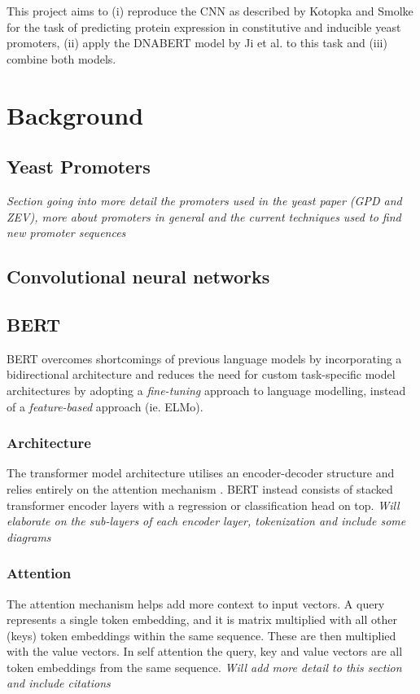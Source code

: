 \documentclass{article}
\begin{document}
This project aims to (i) reproduce the CNN as described by Kotopka and Smolke for the task of predicting protein expression in constitutive and inducible yeast promoters, (ii) apply the DNABERT model by Ji et al. to this task and (iii) combine both models.
 

\section{Background}
\subsection{Yeast Promoters}
\textit{Section going into more detail the promoters used in the yeast paper (GPD and ZEV), more about promoters in general and the current techniques used to find new promoter sequences}

\subsection{Convolutional neural networks}

\subsection{BERT}
BERT overcomes shortcomings of previous language models by incorporating a bidirectional architecture and reduces the need for custom task-specific model architectures by adopting a  \textit{fine-tuning} approach to language modelling, instead of a \textit{feature-based} approach (ie. ELMo). 

\subsubsection{Architecture}
The transformer model architecture utilises an encoder-decoder structure and relies entirely on the attention mechanism \cite{vaswani2017attention}. BERT instead consists of stacked transformer encoder layers with a regression or classification head on top. \textit{Will elaborate on the sub-layers of each encoder layer, tokenization and include some diagrams}

\subsubsection{Attention}
The attention mechanism helps add more context to input vectors. A query represents a single token embedding, and it is matrix multiplied with all other (keys) token embeddings within the same sequence. These are then multiplied with the value vectors. In self attention the query, key and value vectors are all token embeddings from the same sequence. \textit{Will add more detail to this section and include citations}
\end{document}

